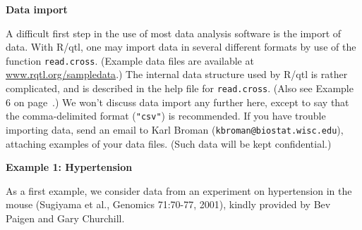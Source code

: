 \documentclass[10pt,letterpaper]{article}
\begin{document}
\noindent \textbf{Data import} \vspace{6pt}

\noindent A difficult first step in the use of most data analysis
software is the import of data.  With R/qtl, one may import data in
several different formats by use of the function \verb-read.cross-.
(Example data files are available at
\href{http://www.rqtl.org/sampledata}{www.rqtl.org/sampledata}.)  The
internal data structure used by R/qtl is rather complicated, and is
described in the help file for \verb-read.cross-.  (Also see Example
6 on page~\pageref{example6}.) We won't discuss data import any further here, except to
say that the comma-delimited format (\verb-"csv"-) is recommended.  If
you have trouble importing data, send an email to Karl Broman
(\verb-kbroman@biostat.wisc.edu-), attaching examples of your data files.
(Such data will be kept confidential.)



\vspace{12pt}
\noindent \textbf{Example 1: Hypertension} \vspace{6pt}
\nopagebreak

\noindent As a first example, we consider data from an experiment on
hypertension in the mouse (Sugiyama et al., Genomics 71:70-77, 2001),
kindly provided by Bev Paigen and Gary Churchill.
\end{document}
